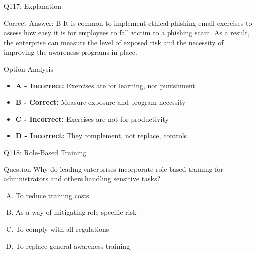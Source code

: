 \documentclass{beamer}
\begin{document}
	\begin{frame}{Q117: Explanation}
		\begin{block}{Correct Answer: B}
			It is common to implement ethical phishing email exercises to assess how easy it is for employees to fall victim to a phishing scam. As a result, the enterprise can measure the level of exposed risk and the necessity of improving the awareness programs in place.
		\end{block}
		\begin{block}{Option Analysis}
			\begin{itemize}
				\item \textbf{A - Incorrect:} Exercises are for learning, not punishment
				\item \textbf{B - Correct:} Measure exposure and program necessity
				\item \textbf{C - Incorrect:} Exercises are not for productivity
				\item \textbf{D - Incorrect:} They complement, not replace, controls
			\end{itemize}
		\end{block}
	\end{frame}
	
	\begin{frame}{Q118: Role-Based Training}
		\begin{block}{Question}
			Why do leading enterprises incorporate role-based training for administrators and others handling sensitive tasks?
		\end{block}
		\begin{enumerate}[(A)]
			\item To reduce training costs
			\item As a way of mitigating role-specific risk
			\item To comply with all regulations
			\item To replace general awareness training
		\end{enumerate}
	\end{frame}
	
\end{document}
